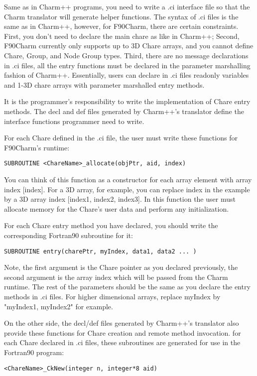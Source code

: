 \documentclass[11pt]{article}
\begin{document}
Same as in Charm++ programs, you need to write a .ci interface file
so that the Charm translator will generate helper functions. The syntax of .ci files
is the same as in Charm++, however, for F90Charm, there are certain
constraints. First, you don't need to declare the main chare as like in Charm++;
Second, F90Charm currently only supports up to 3D Chare arrays, and you cannot define 
Chare, Group, and Node Group types. Third, there are no message declarations in .ci files, 
all the entry functions must be declared in the parameter marshalling 
fashion of Charm++.
Essentially, users can declare in .ci files readonly variables and 1-3D
chare arrays with parameter marshalled entry methods.

It is the programmer's responsibility to write the implementation of Chare
entry methods. The decl and def files generated by Charm++'s translator define
the interface functions programmer need to write.

For each Chare defined in the .ci file, the user must write these functions
for F90Charm's runtime:

  \verb+SUBROUTINE <ChareName>_allocate(objPtr, aid, index)+

  You can think of this function as a constructor for each array element 
with array index [index]. For a 3D array, for example, you can replace index in the 
example by a 3D array index [index1, index2, index3]. 
In this function the user must allocate memory for 
the Chare's user data and perform any initialization.

  For each Chare entry method you have declared, you should write the corresponding 
Fortran90 subroutine for it:

  \verb+SUBROUTINE entry(charePtr, myIndex, data1, data2 ... )+

  Note, the first argument is the Chare pointer as you declared previously, the second argument is the array index which will be passed from the Charm runtime. 
The rest of the parameters should be the same as you declare the entry methods
in .ci files. For higher dimensional arrays, replace myIndex by "myIndex1, myIndex2" for example.

On the other side, the decl/def files generated by Charm++'s translator also
provide these functions for Chare creation and remote method invocation. 
for each Chare declared in .ci files, these subroutines are generated for use
 in the Fortran90 program:

  \verb+<ChareName>_CkNew(integer n, integer*8 aid)+
\end{document}
